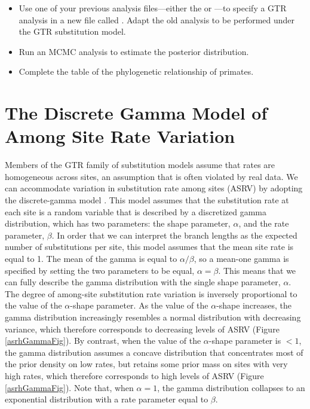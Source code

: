 \begin{itemize}
\item Use one of your previous analysis files---either the  or ---to specify a GTR analysis in a new file called .
	Adapt the old analysis to be performed under the GTR substitution model. 
\item Run an MCMC analysis to estimate the posterior distribution.
\item Complete the table of the phylogenetic relationship of primates.
\end{itemize}






\section{The Discrete Gamma Model of Among Site Rate Variation}


Members of the GTR family of substitution models assume that rates are homogeneous across sites, an assumption that is often violated by real data.
We can accommodate variation in substitution rate among sites (ASRV) by adopting the discrete-gamma model \citep{Yang1994a}.
This model assumes that the substitution rate at each site is a random variable that is described by a discretized gamma distribution, which has two parameters: the shape parameter, $\alpha$, and the rate parameter, $\beta$. 
In order that we can interpret the branch lengths as the expected number of substitutions per site, this model assumes that the mean site rate is equal to 1.
The mean of the gamma is equal to $\alpha/\beta$, so a mean-one gamma is specified by setting the two parameters to be equal, $\alpha=\beta$.
This means that we can fully describe the gamma distribution with the single shape parameter, $\alpha$. 
The degree of among-site substitution rate variation is inversely proportional to the value of the $\alpha$-shape parameter.
As the value of the $\alpha$-shape increases, the gamma distribution increasingly resembles a normal distribution with decreasing variance, which therefore corresponds to decreasing levels of ASRV (Figure \ref{asrhGammaFig}).
By contrast, when the value of the $\alpha$-shape parameter is $< 1$, the gamma distribution assumes a concave distribution that concentrates most of the prior density on low rates, but retains some prior mass on sites with very high rates, which therefore corresponds to high levels of ASRV (Figure \ref{asrhGammaFig}).
Note that, when $\alpha = 1$, the gamma distribution collapses to an exponential distribution with a rate parameter equal to $\beta$.


